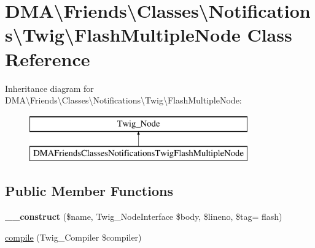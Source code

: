 \hypertarget{classDMA_1_1Friends_1_1Classes_1_1Notifications_1_1Twig_1_1FlashMultipleNode}{}\section{D\+M\+A\textbackslash{}Friends\textbackslash{}Classes\textbackslash{}Notifications\textbackslash{}Twig\textbackslash{}Flash\+Multiple\+Node Class Reference}
\label{classDMA_1_1Friends_1_1Classes_1_1Notifications_1_1Twig_1_1FlashMultipleNode}
Inheritance diagram for D\+M\+A\textbackslash{}Friends\textbackslash{}Classes\textbackslash{}Notifications\textbackslash{}Twig\textbackslash{}Flash\+Multiple\+Node\+:\begin{figure}[H]
\begin{center}
\leavevmode
\includegraphics[height=2.000000cm]{db/dab/classDMA_1_1Friends_1_1Classes_1_1Notifications_1_1Twig_1_1FlashMultipleNode}
\end{center}
\end{figure}
\subsection*{Public Member Functions}
\begin{DoxyCompactItemize}
\item 
\hypertarget{classDMA_1_1Friends_1_1Classes_1_1Notifications_1_1Twig_1_1FlashMultipleNode_a24c16c7fcf28befcf22abe1a793929f0}{}{\bfseries \+\_\+\+\_\+construct} (\$name, Twig\+\_\+\+Node\+Interface \$body, \$lineno, \$tag= \textquotesingle{}flash\textquotesingle{})\label{classDMA_1_1Friends_1_1Classes_1_1Notifications_1_1Twig_1_1FlashMultipleNode_a24c16c7fcf28befcf22abe1a793929f0}

\item 
\hyperlink{classDMA_1_1Friends_1_1Classes_1_1Notifications_1_1Twig_1_1FlashMultipleNode_ac6bd08da54fa162093a87dcabd1bef65}{compile} (Twig\+\_\+\+Compiler \$compiler)
\end{DoxyCompactItemize}


